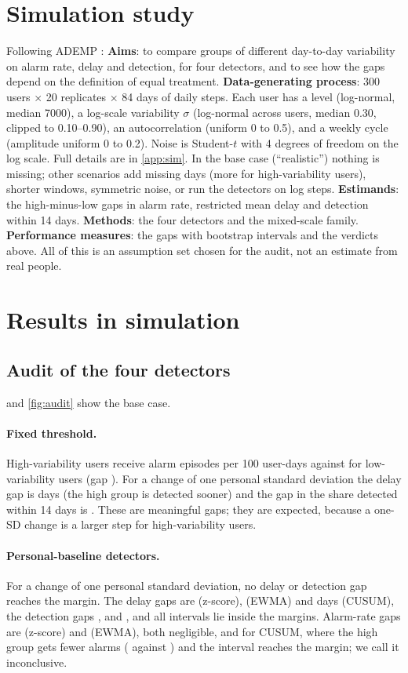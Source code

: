 \documentclass[11pt,a4paper]{article}
\begin{document}
\section{Simulation study}\label{sec:sim}
Following ADEMP \citep{morris2019}:
\textbf{Aims}: to compare groups of different day-to-day variability on alarm rate, delay and detection, for four detectors, and to see how the gaps depend on the definition of equal treatment.
\textbf{Data-generating process}: 300 users $\times$ 20 replicates $\times$ 84 days of daily steps. Each user has a level (log-normal, median 7000), a log-scale variability $\sigma$ (log-normal across users, median 0.30, clipped to 0.10--0.90), an autocorrelation (uniform 0 to 0.5), and a weekly cycle (amplitude uniform 0 to 0.2). Noise is Student-$t$ with 4 degrees of freedom on the log scale. Full details are in \cref{app:sim}. In the base case (``realistic'') nothing is missing; other scenarios add missing days (more for high-variability users), shorter windows, symmetric noise, or run the detectors on log steps.
\textbf{Estimands}: the high-minus-low gaps in alarm rate, restricted mean delay and detection within 14 days.
\textbf{Methods}: the four detectors and the mixed-scale family.
\textbf{Performance measures}: the gaps with bootstrap intervals and the verdicts above.
All of this is an assumption set chosen for the audit, not an estimate from real people.

\section{Results in simulation}
\subsection{Audit of the four detectors}\label{sec:audit}
 and \cref{fig:audit} show the base case.
\paragraph{Fixed threshold.}
High-variability users receive \GrpFixedHighAlarm{} alarm episodes per 100 user-days against \GrpFixedLowAlarm{} for low-variability users (gap \RealFixedAlarmCI). For a change of one personal standard deviation the delay gap is \RealFixedRmdStdCI{} days (the high group is detected sooner) and the gap in the share detected within 14 days is \RealFixedDetStd. These are meaningful gaps; they are expected, because a one-SD change is a larger step for high-variability users.
\paragraph{Personal-baseline detectors.}
For a change of one personal standard deviation, no delay or detection gap reaches the margin. The delay gaps are \RealZscoreRmdStd{} (z-score), \RealEwmaRmdStd{} (EWMA) and \RealCusumRmdStd{} days (CUSUM), the detection gaps \RealZscoreDetStd, \RealEwmaDetStd{} and \RealCusumDetStd, and all intervals lie inside the margins.
Alarm-rate gaps are \RealZscoreAlarm{} (z-score) and \RealEwmaAlarm{} (EWMA), both negligible, and \RealCusumAlarmCI{} for CUSUM, where the high group gets fewer alarms (\GrpCusumHighAlarm{} against \GrpCusumLowAlarm) and the interval reaches the margin; we call it inconclusive.
\end{document}

